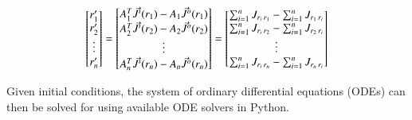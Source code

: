 \begin{equation}
\renewcommand\arraystretch{1.0}
\begin{bmatrix}
    r_1' \\
    r_2' \\
    \vdots \\
    r_n'
\end{bmatrix}
=
\renewcommand\arraystretch{1.0}
\begin{bmatrix}
    A^T_1\vec{J}^{i}(r_1) - A_1\vec{J}^{o}(r_1) \\
    A^T_2\vec{J}^{i}(r_2) - A_2\vec{J}^{o}(r_2) \\
    \vdots  \\
    A^T_n\vec{J}^{i}(r_n) - A_n\vec{J}^{o}(r_n) \\
\end{bmatrix}
=
\renewcommand\arraystretch{1.0}
\begin{bmatrix}
    \sum_{i=1}^n \flux{r_i}{r_1} - \sum_{i=1}^n \flux{r_1}{r_i} \\
    \sum_{i=1}^n \flux{r_i}{r_2} - \sum_{i=1}^n \flux{r_2}{r_i} \\
    \vdots  \\
    \sum_{i=1}^n \flux{r_i}{r_n} - \sum_{i=1}^n \flux{r_n}{r_i}
\end{bmatrix}
\end{equation}

\noindent Given initial conditions, the system of ordinary differential equations (ODEs) can then be solved for using available ODE solvers in Python.

